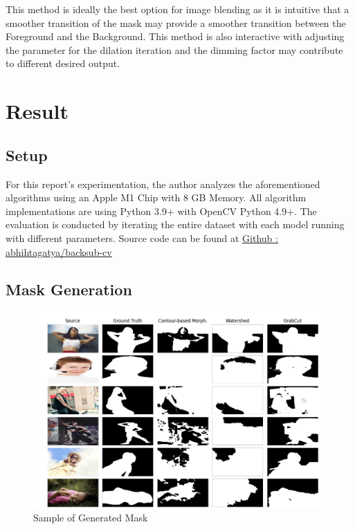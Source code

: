 \documentclass{article}
\begin{document}
This method is ideally the best option for image blending as it is intuitive that a smoother transition of the mask may provide a smoother transition between the Foreground and the Background. This method is also interactive with adjusting the parameter for the dilation iteration and the dimming factor may contribute to different desired output.


\section{Result}

\subsection{Setup}

For this report's experimentation, the author analyzes the aforementioned algorithms using an Apple M1 Chip with 8 GB Memory. All algorithm implementations are using Python 3.9+ with OpenCV Python 4.9+. 
The evaluation is conducted by iterating the entire dataset with each model running with different parameters. Source code can be found at \href{https://github.com/abhishtagatya/backsub-cv}{Github : abhihtagatya/backsub-cv}

\subsection{Mask Generation}

\begin{figure}[htbp]
    \centering
    \includegraphics[width=1\linewidth]{img/MaskG.png}
    \caption{Sample of Generated Mask}
    \label{fig:gmask}
\end{figure}
\end{document}
